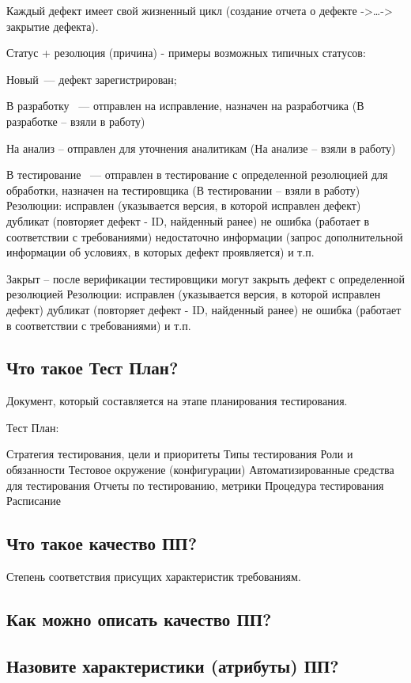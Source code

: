 Каждый дефект имеет свой жизненный цикл (создание отчета о дефекте ->…->
закрытие дефекта).

Статус + резолюция (причина) - примеры возможных типичных статусов:

Новый — дефект зарегистрирован;

В разработку  — отправлен на исправление, назначен на разработчика (В
разработке – взяли в работу) 

На анализ – отправлен для уточнения аналитикам (На анализе – взяли в работу)

В тестирование  — отправлен в тестирование с определенной резолюцией для
обработки, назначен на тестировщика (В тестировании – взяли в работу)
Резолюции: 
исправлен (указывается версия, в которой исправлен дефект)
дубликат (повторяет дефект - ID, найденный ранее)
не ошибка (работает в соответствии с требованиями)
недостаточно информации (запрос дополнительной информации об условиях, в
которых дефект проявляется)
и т.п.

Закрыт – после верификации тестировщики могут закрыть дефект с определенной
резолюцией
Резолюции: 
исправлен (указывается версия, в которой исправлен дефект)
дубликат (повторяет дефект - ID, найденный ранее)
не ошибка (работает в соответствии с требованиями)
и т.п.

\subsection{Что такое Тест План?}

Документ, который составляется на этапе планирования тестирования.

Тест План:

Стратегия тестирования, цели и приоритеты
Типы тестирования 
Роли и обязанности
Тестовое окружение (конфигурации)
Автоматизированные средства для тестирования
Отчеты по тестированию, метрики
Процедура тестирования
Расписание

\subsection{Что такое качество ПП?}

Степень соответствия присущих характеристик требованиям.

\subsection{Как можно описать качество ПП?}

\subsection{Назовите характеристики (атрибуты) ПП?}

